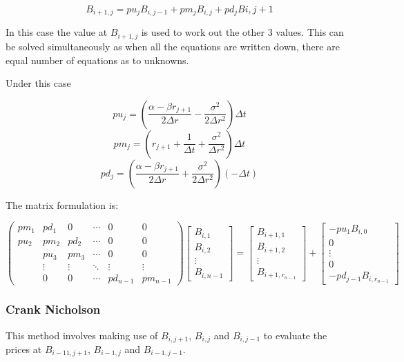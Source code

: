 \documentclass[12pt,a4paper]{article}
\begin{document}
$$B_{i+1,j}= pu_{j}B_{i,j-1}+pm_{j}B_{i,j}+pd_{j}B{i,j+1} $$

In this case the value at $B_{i+1,j}$ is used to work out the other 3 values. This can be solved simultaneously as when all the equations are written down, there are equal number of equations as to unknowns.


Under this case

$$pu_{j}= (\frac{\alpha-\beta r_{j+1}}{2\Delta r} - \frac{\sigma^2}{2\Delta r^2})\Delta t$$ 
$$pm_{j}= (r_{j+1}+\frac{1}{\Delta t} + \frac{\sigma^2}{\Delta r ^2})\Delta t$$
$$pd_{j}= (\frac{\alpha-\beta r_{j+1}}{2\Delta r} + \frac{\sigma^2}{2\Delta r^2})(-\Delta t) $$

The matrix formulation is:

$$\left( \begin{array}{cccccc}
pm_{1} & pd_{1} & 0 & \cdots  & 0 & 0\\
pu_{2} & pm_{2} & pd_{2} &\cdots & 0 & 0 \\
& pu_{3} & pm_{3} & \cdots & 0 & 0  \\
& \vdots &\vdots & \ddots & \vdots & \vdots \\ 
& 0 & 0 & \cdots & pd_{n-1} & pm_{n-1} \end{array} \right)
%
\begin{bmatrix}
B_{i,1} \\
B_{i,2} \\
\vdots \\
B_{i,n-1}
\end{bmatrix}
=
\begin{bmatrix}
B_{i+1,1} \\
B_{i+1,2} \\
\vdots \\
B_{i+1,r_{n-1}}
\end{bmatrix}
+
\begin{bmatrix}
-pu_{1}B_{i,0} \\
0 \\
\vdots \\
0 \\
-pd_{j-1}B_{i, r_{n-1}}
\end{bmatrix}
$$


\subsubsection{Crank Nicholson}

This method involves making use of $B_{i,j+1}$, $B_{i,j}$ and $B_{i,j-1}$ to evaluate the prices at $B_{i-11,j+1}$, $B_{i-1,j}$ and $B_{i-1,j-1}$. 
\end{document}
